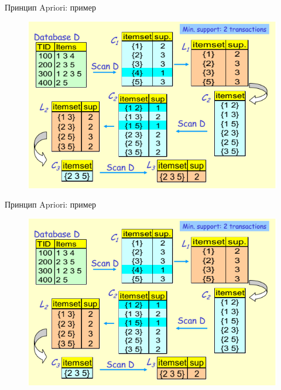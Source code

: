 \documentclass{beamer}
\begin{document}
\begin{frame}{Принцип Apriori: пример}
\begin{figure}[h]
\centering
\includegraphics[scale=0.75]{images/lec08-pic13.png}
\end{figure}
\end{frame}

\begin{frame}{Принцип Apriori: пример}
\begin{figure}[h]
\centering
\includegraphics[scale=0.75]{images/lec08-pic13.png}
\end{figure}
\end{frame}
\end{document}
